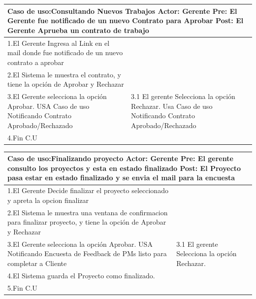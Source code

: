 \begin{longtable}{|p{}|p{}|}
    \hline
    \multicolumn{2}{|p{16cm}|}{
        \textbf{Caso de uso:}Consultando Nuevos Trabajos\newline
        \textbf{Actor:} Gerente\newline
        \textbf{Pre: }El Gerente fue notificado de un nuevo Contrato para Aprobar\newline
        \textbf{Post:}  El Gerente Aprueba un contrato de trabajo
    }\\
    \hline
    1.El Gerente Ingresa al Link en el mail donde fue notificado de un nuevo contrato a aprobar&    \\
    \hline
    2.El Sistema le muestra el contrato, y tiene la opción de Aprobar y Rechazar& \\
    \hline
    3.El Gerente selecciona la opción Aprobar. USA Caso de uso Notificando Contrato Aprobado/Rechazado& 3.1 El gerente Selecciona la opción Rechazar. Usa Caso de uso Notificando Contrato Aprobado/Rechazado\\
    \hline
    4.Fin C.U&\\
    \hline
\end{longtable}
\begin{longtable}{|p{}|p{}|}
    \hline
    \multicolumn{2}{|p{16cm}|}{
        \textbf{Caso de uso:}Finalizando proyecto\newline
        \textbf{Actor:} Gerente\newline
        \textbf{Pre: }El gerente consulto los proyectos y esta en estado finalizado\newline
        \textbf{Post:}  El Proyecto pasa estar en estado finalizado y se envia el mail para la encuesta
    }\\
    \hline
    1.El Gerente Decide finalizar el proyecto seleccionado y apreta la opcion finalizar&    \\
    \hline
    2.El Sistema le muestra una ventana de confirmacion para finalizar proyecto, y tiene la opción de Aprobar y Rechazar& \\
    \hline
    3.El Gerente selecciona la opción Aprobar. USA Notificando Encuesta de Feedback de PMs listo para completar a Cliente& 3.1 El gerente Selecciona la opción Rechazar. \\
    \hline
    4.El Sistema guarda el Proyecto como finalizado.&\\
    \hline
    5.Fin C.U&\\
    \hline
\end{longtable}

